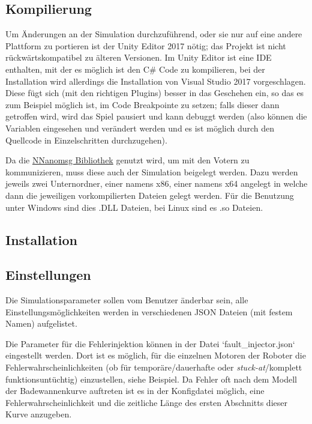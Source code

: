 \documentclass[
    12pt,
    bibliography=totoc,
    ngerman,
    enabledeprecatedfontcommands
]{scrartcl}
\begin{document}
\subsection{Kompilierung}
Um {\"{A}}nderungen an der Simulation durchzuf{\"{u}}hrend, oder sie nur auf eine andere Plattform
zu portieren ist der Unity Editor 2017 n{\"{o}}tig; das Projekt ist nicht r{\"{u}}ckw{\"{a}}rtskompatibel zu {\"{a}}lteren Versionen. Im Unity Editor
ist eine IDE enthalten, mit der es m{\"{o}}glich ist den C\# Code zu kompilieren, bei der Installation wird allerdings die Installation von Visual Studio
2017 vorgeschlagen. Diese f{\"{u}}gt sich (mit den richtigen Plugins) besser in das Geschehen ein, so das es zum Beispiel m{\"{o}}glich ist, im Code
Breakpointe zu setzen; falls dieser dann getroffen wird, wird das Spiel pausiert und kann debuggt werden (also k{\"{o}}nnen die Variablen eingesehen
und ver{\"{a}}ndert werden und es ist m{\"{o}}glich durch den Quellcode in Einzelschritten durchzugehen).

Da die \href{https://github.com/mhowlett/NNanomsg}{NNanomsg Bibliothek} genutzt wird, um mit den Votern zu kommunizieren, muss diese auch der Simulation beigelegt werden. 
Dazu werden jeweils zwei Unternordner, einer namens x86, einer namens x64 angelegt in welche dann die jeweiligen vorkompilierten Dateien gelegt werden. F{\"{u}}r die
Benutzung unter Windows sind dies .DLL Dateien, bei Linux sind es .so Dateien.


\subsection{Installation}
\todo{}

\subsection{Einstellungen}
Die Simulationsparameter sollen vom Benutzer {\"{a}}nderbar sein, alle Einstellungsm{\"{o}}glichkeiten werden in verschiedenen JSON Dateien (mit festem Namen) aufgelistet.

Die Parameter f{\"{u}}r die Fehlerinjektion k{\"{o}}nnen in der Datei `fault\_injector.json` eingestellt werden. Dort ist es m{\"{o}}glich, f{\"{u}}r die einzelnen Motoren
der Roboter die Fehlerwahrscheinlichkeiten (ob f{\"{u}}r tempor{\"{a}}re/dauerhafte oder \textit{stuck-at}/komplett funktionsunt{\"{u}}chtig) einzustellen, siehe
Beispiel. Da Fehler oft nach dem Modell der Badewannenkurve auftreten ist es in der Konfigdatei m{\"{o}}glich, eine Fehlerwahrscheinlichkeit und die zeitliche L{\"{a}}nge
des ersten Abschnitts dieser Kurve anzugeben.
\end{document}
